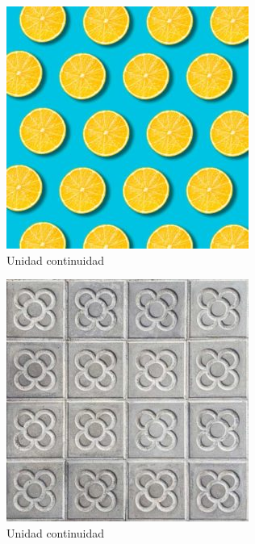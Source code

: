 \documentclass[
  16pt,
]{krantz}
\theoremstyle{definition}
\theoremstyle{definition}
\theoremstyle{definition}
\theoremstyle{definition}
\theoremstyle{remark}
\begin{document}
\begin{figure}

{\centering \includegraphics[width=1\linewidth,height=1\textheight]{unidad2} 

}

\caption{Unidad continuidad}\label{fig:unidad2}
\end{figure}

\begin{figure}

{\centering \includegraphics[width=1\linewidth,height=1\textheight]{unidad3} 

}

\caption{Unidad continuidad}\label{fig:unidad3}
\end{figure}
\end{document}
